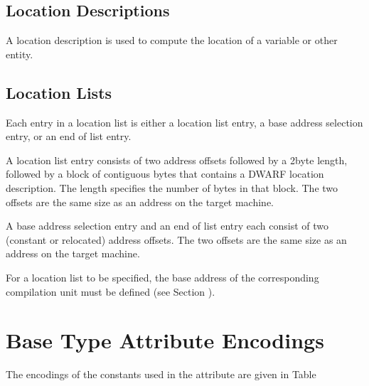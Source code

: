 \subsection{Location Descriptions}
\label{datarep:locationdescriptions}

A location description is used to compute the 
location of a variable or other entity.

\subsection{Location Lists}
\label{datarep:locationlists}

Each entry in a location list is either a location list entry,
a base address selection entry, or an end of list entry.

A location list entry consists of two address offsets followed
by a 2\dash byte length, followed by a block of contiguous bytes
that contains a DWARF location description. The length
specifies the number of bytes in that block. The two offsets
are the same size as an address on the target machine.

A base address selection entry and an end of list entry each
consist of two (constant or relocated) address offsets. The two
offsets are the same size as an address on the target machine.

For a location list to be specified, the base address of
the corresponding compilation unit must be defined 
(see Section  ).

\section{Base Type Attribute Encodings}
\label{datarep:basetypeattributeencodings}

The encodings of the constants used in the 
attribute are given in 
Table 

